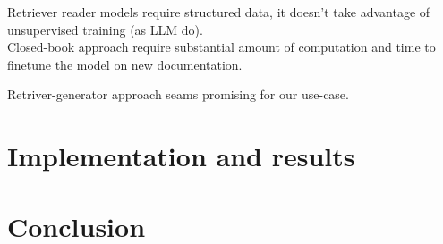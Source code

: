 \documentclass{beamer}
\begin{document}
\begin{frame}{}
    \begin{alertblock}{}
        Retriever reader models require structured data, it doesn't take advantage of unsupervised training (as LLM do).\\ 
        Closed-book approach require substantial amount of computation and time to finetune the model on new documentation.  
    \end{alertblock}

    \begin{exampleblock}{}
        Retriver-generator approach seams promising for our use-case.
    \end{exampleblock}
\end{frame}

\section{Implementation and results}
\section{Conclusion}
\end{document}
